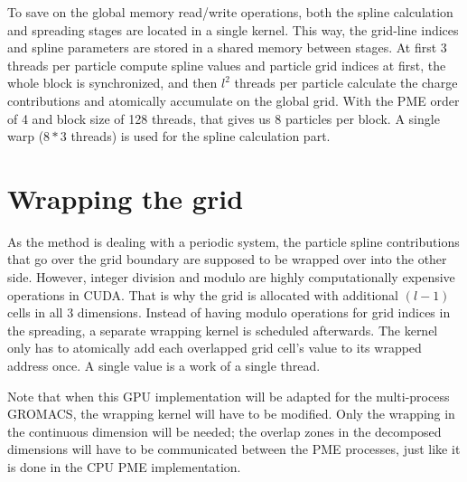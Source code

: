 \documentclass[12pt,a4paper]{report}
\newcommand{\draft}[1]{#1}
\begin{document}
To save on the global memory read/write operations, both the spline calculation and spreading stages are located in a single kernel. This way, the grid-line indices and spline parameters are stored in a shared memory between stages. At first 3 threads per particle compute spline values and particle grid indices at first, the whole block is synchronized, and then $l^2$ threads per particle calculate the charge contributions and atomically accumulate on the global grid. With the PME order of 4 and block size of 128 threads, that gives us 8 particles per block. A single warp ($8 * 3$ threads) is used for the spline calculation part.




\section{Wrapping the grid}
As the method is dealing with a periodic system, the particle spline contributions that go over the grid boundary are supposed to be wrapped over into the other side.
However, integer division and modulo are highly computationally expensive operations in CUDA. %
That is why the grid is allocated with additional $(l-1)$ cells in all 3 dimensions. Instead of having modulo operations for grid indices in the spreading, 
a separate wrapping kernel is scheduled afterwards. The kernel only has to atomically add each overlapped grid cell's value to its wrapped address once. A single value is a work of a single thread.

Note that when this GPU implementation will be adapted for the multi-process GROMACS, the wrapping kernel will have to be modified. Only the wrapping in the continuous dimension will be needed; the overlap zones in the decomposed dimensions will have to be communicated between the PME processes, just like it is done in the CPU PME implementation. 
\end{document}
